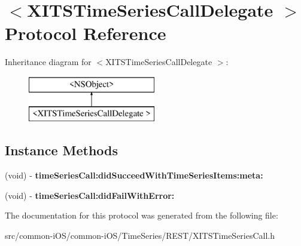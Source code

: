 \hypertarget{protocol_x_i_t_s_time_series_call_delegate_01-p}{}\section{$<$X\+I\+T\+S\+Time\+Series\+Call\+Delegate $>$ Protocol Reference}
\label{protocol_x_i_t_s_time_series_call_delegate_01-p}
Inheritance diagram for $<$X\+I\+T\+S\+Time\+Series\+Call\+Delegate $>$\+:\begin{figure}[H]
\begin{center}
\leavevmode
\includegraphics[height=2.000000cm]{protocol_x_i_t_s_time_series_call_delegate_01-p}
\end{center}
\end{figure}
\subsection*{Instance Methods}
\begin{DoxyCompactItemize}
\item 
\hypertarget{protocol_x_i_t_s_time_series_call_delegate_01-p_a4a0ea83e7d2c81177a7b166f24b84092}{}\label{protocol_x_i_t_s_time_series_call_delegate_01-p_a4a0ea83e7d2c81177a7b166f24b84092} 
(void) -\/ {\bfseries time\+Series\+Call\+:did\+Succeed\+With\+Time\+Series\+Items\+:meta\+:}
\item 
\hypertarget{protocol_x_i_t_s_time_series_call_delegate_01-p_a0048d115f64efb212da51e3d64f40a94}{}\label{protocol_x_i_t_s_time_series_call_delegate_01-p_a0048d115f64efb212da51e3d64f40a94} 
(void) -\/ {\bfseries time\+Series\+Call\+:did\+Fail\+With\+Error\+:}
\end{DoxyCompactItemize}


The documentation for this protocol was generated from the following file\+:\begin{DoxyCompactItemize}
\item 
src/common-\/i\+O\+S/common-\/i\+O\+S/\+Time\+Series/\+R\+E\+S\+T/X\+I\+T\+S\+Time\+Series\+Call.\+h\end{DoxyCompactItemize}
